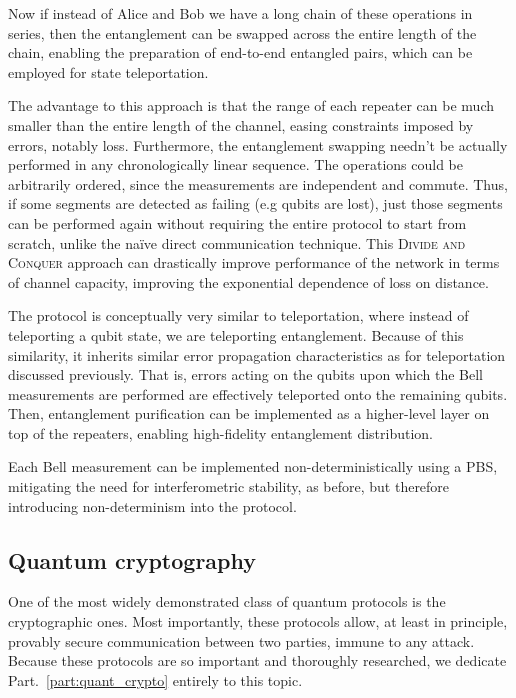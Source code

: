 Now if instead of Alice and Bob we have a long chain of these operations in series, then the entanglement can be swapped across the entire length of the chain, enabling the preparation of end-to-end entangled pairs, which can be employed for state teleportation.

The advantage to this approach is that the range of each repeater can be much smaller than the entire length of the channel, easing constraints imposed by errors, notably loss. Furthermore, the entanglement swapping needn't be actually performed in any chronologically linear sequence. The operations could be arbitrarily ordered, since the measurements are independent and commute. Thus, if some segments are detected as failing (e.g qubits are lost), just those segments can be performed again without requiring the entire protocol to start from scratch, unlike the na{\" i}ve direct communication technique. This \textsc{Divide and Conquer} approach can drastically improve performance of the network in terms of channel capacity, improving the exponential dependence of loss on distance. 

The protocol is conceptually very similar to teleportation, where instead of teleporting a qubit state, we are teleporting entanglement. Because of this similarity, it inherits similar error propagation characteristics as for teleportation discussed previously. That is, errors acting on the qubits upon which the Bell measurements are performed are effectively teleported onto the remaining qubits. Then, entanglement purification can be implemented as a higher-level layer on top of the repeaters, enabling high-fidelity entanglement distribution.

Each Bell measurement can be implemented non-deterministically using a PBS, mitigating the need for interferometric stability, as before, but therefore introducing non-determinism into the protocol.

%
%

\subsection{Quantum cryptography}\label{sec:QKD_prot}

One of the most widely demonstrated class of quantum protocols is the cryptographic ones. Most importantly, these protocols allow, at least in principle, provably secure communication between two parties, immune to any attack. Because these protocols are so important and thoroughly researched, we dedicate Part.~\ref{part:quant_crypto} entirely to this topic.

